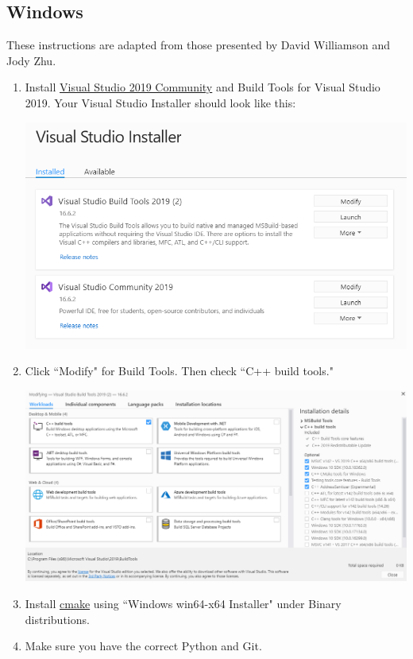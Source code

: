 \documentclass[11 pt]{article}
\begin{document}
\subsection{Windows}
These instructions are adapted from those presented by David Williamson and Jody Zhu.
\begin{enumerate}
\item Install \href{https://visualstudio.microsoft.com/downloads/}{Visual Studio 2019 Community} and Build Tools for Visual Studio 2019. Your Visual Studio Installer should look like this:
\begin{center}
\includegraphics[scale=0.4]{images/VS.png}
\end{center}
\item Click ``Modify" for Build Tools. Then check ``C++ build tools."
\begin{center}
\includegraphics[scale=0.3]{images/Modify.png}
\end{center}
\item Install \href{https://www.cmake.org/download}{cmake} using ``Windows win64-x64 Installer" under Binary distributions.
\item Make sure you have the correct Python and Git.

\end{enumerate}
\end{document}
